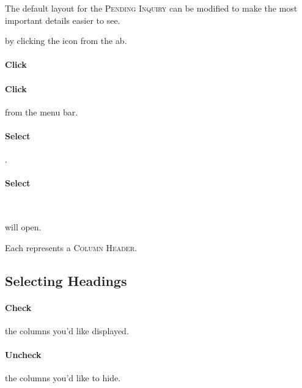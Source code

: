 The default layout for the \textsc{Pending Inquiry} can be modified to make the most important details easier to see.

 by clicking the  icon from the \gls{ab}.

\paragraph{Click} 

\paragraph{Click}  from the menu bar.

\paragraph{Select} .

\paragraph{Select} \\


 will open.\\


Each {\faCheckSquareO } represents a \textsc{Column Header}.

\subsection{Selecting Headings}

\paragraph{Check {\faCheckSquareO }} the columns you'd like displayed.

\paragraph{Uncheck {\faSquareO }} the columns you'd like to hide.

